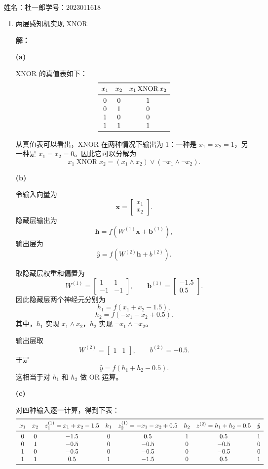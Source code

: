 \documentclass[a4paper]{article}
\makeatletter
\newcommand{\courseheader}{
        \begin{center}
            {\Large \heiti \@courseinstitute \quad \@coursename}\\[0.5em]
            {\large \@term \quad \@hwname 5 \quad \@slname}
        \end{center}
        \vspace{1em}
    }
\newcommand{\name}[1]{\noindent #1 \par\vspace{1em}}
\newenvironment{solution}{\par\noindent\textbf{解：}\par}{\par}
\makeatother
\begin{document}
\courseheader
\name{姓名：杜一郎\qquad 学号：2023011618}

\begin{enumerate}
\setlength{\itemsep}{3\parskip}

\item 两层感知机实现 XNOR
\begin{solution}
\textbf{(a)}

XNOR 的真值表如下：
\[
\begin{array}{ccc}
\toprule
x_1 & x_2 & x_1 \operatorname{XNOR} x_2\\
\midrule
0 & 0 & 1\\
0 & 1 & 0\\
1 & 0 & 0\\
1 & 1 & 1\\
\bottomrule
\end{array}
\]

从真值表可以看出，XNOR 在两种情况下输出为 $1$：一种是 $x_1=x_2=1$，另一种是 $x_1=x_2=0$。因此它可以分解为
\[
x_1 \operatorname{XNOR} x_2
=
(x_1\land x_2)\lor(\lnot x_1\land \lnot x_2).
\]


\textbf{(b)}

令输入向量为
\[
\bm{x}=
\begin{bmatrix}
x_1\\
x_2
\end{bmatrix}.
\]
隐藏层输出为
\[
\bm{h}=f\left(W^{(1)}\bm{x}+\bm{b}^{(1)}\right),
\]
输出层为
\[
\hat{y}=f\left(W^{(2)}\bm{h}+b^{(2)}\right).
\]

取隐藏层权重和偏置为
\[
W^{(1)}
=
\begin{bmatrix}
1 & 1\\
-1 & -1
\end{bmatrix},
\qquad
\bm{b}^{(1)}
=
\begin{bmatrix}
-1.5\\
0.5
\end{bmatrix}.
\]
因此隐藏层两个神经元分别为
\[
h_1=f(x_1+x_2-1.5),
\]
\[
h_2=f(-x_1-x_2+0.5).
\]
其中，$h_1$ 实现 $x_1\land x_2$，$h_2$ 实现 $\lnot x_1\land \lnot x_2$。

输出层取
\[
W^{(2)}
=
\begin{bmatrix}
1 & 1
\end{bmatrix},
\qquad
b^{(2)}=-0.5.
\]
于是
\[
\hat{y}=f(h_1+h_2-0.5).
\]
这相当于对 $h_1$ 和 $h_2$ 做 OR 运算。

\textbf{(c)}

对四种输入逐一计算，得到下表：
\[
\begin{array}{cccccccc}
\toprule
x_1 & x_2 & z_1^{(1)}=x_1+x_2-1.5 & h_1
& z_2^{(1)}=-x_1-x_2+0.5 & h_2
& z^{(2)}=h_1+h_2-0.5 & \hat{y}\\
\midrule
0 & 0 & -1.5 & 0 & 0.5  & 1 & 0.5  & 1\\
0 & 1 & -0.5 & 0 & -0.5 & 0 & -0.5 & 0\\
1 & 0 & -0.5 & 0 & -0.5 & 0 & -0.5 & 0\\
1 & 1 & 0.5  & 1 & -1.5 & 0 & 0.5  & 1\\
\bottomrule
\end{array}
\]


\end{solution}
\end{enumerate}
\end{document}
